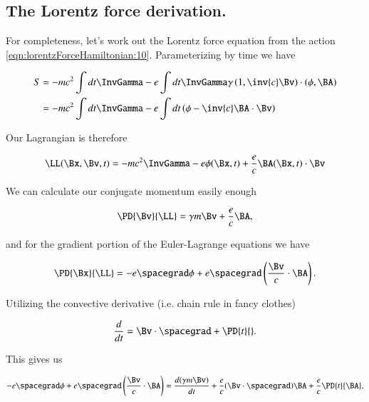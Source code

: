 \subsection{The Lorentz force derivation.}

For completeness, let's work out the Lorentz force equation from the action \ref{eqn:lorentzForceHamiltonian:10}.  Parameterizing by time we have

\begin{align*}
S 
&= -m c^2 \int dt \InvGamma - e \int dt \InvGamma \gamma \left( 1, \inv{c} \Bv\right) \cdot (\phi, \BA) \\
&= -m c^2 \int dt \InvGamma - e \int dt \left( \phi - \inv{c} \BA \cdot \Bv \right)
\end{align*}

Our Lagrangian is therefore

\begin{equation}\label{eqn:lorentzForceHamiltonian:31}
\LL(\Bx, \Bv, t) = 
-m c^2 \InvGamma - e \phi(\Bx, t) + \frac{e}{c} \BA(\Bx, t) \cdot \Bv
\end{equation}

We can calculate our conjugate momentum easily enough

\begin{equation}\label{eqn:lorentzForceHamiltonian:40}
\PD{\Bv}{\LL} = \gamma m \Bv + \frac{e}{c} \BA,
\end{equation}

and for the gradient portion of the Euler-Lagrange equations we have

\begin{equation}\label{eqn:lorentzForceHamiltonian:60}
\PD{\Bx}{\LL} = -e \spacegrad \phi + e \spacegrad \left( \frac{\Bv}{c} \cdot \BA \right).
\end{equation}

Utilizing the convective derivative (i.e. chain rule in fancy clothes) 

\begin{equation}\label{eqn:lorentzForceHamiltonian:80}
\frac{d}{dt} = \Bv \cdot \spacegrad + \PD{t}{}.
\end{equation}

This gives us

\begin{equation}\label{eqn:lorentzForceHamiltonian:100}
-e \spacegrad \phi + e \spacegrad \left( \frac{\Bv}{c} \cdot \BA \right) = 
\frac{d(\gamma m \Bv)}{dt} 
+ \frac{e}{c} (\Bv \cdot \spacegrad) \BA
+ \frac{e}{c} \PD{t}{\BA},
\end{equation}

